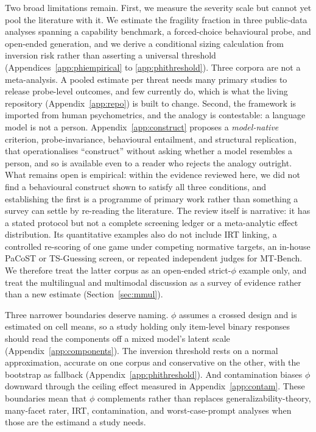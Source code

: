 \documentclass[11pt]{article}
\begin{document}
Two broad limitations remain. First, we
measure the severity scale but cannot yet pool the literature with it. We
estimate the fragility fraction in three public-data analyses spanning a
capability benchmark, a forced-choice behavioural probe, and open-ended
generation, and we derive a conditional sizing calculation from inversion risk
rather than asserting a universal threshold
(Appendices~\ref{app:phiempirical} to \ref{app:phithreshold}). Three corpora
are not a meta-analysis. A pooled estimate per threat needs many primary studies
to release probe-level outcomes, and few currently do, which is what the
living repository (Appendix~\ref{app:repo}) is built to change. Second,
the framework is imported from human psychometrics, and the
analogy is contestable: a language model is not a person.
Appendix~\ref{app:construct} proposes a \emph{model-native}
criterion, probe-invariance, behavioural entailment, and structural replication,
that operationalises ``construct'' without asking whether a model resembles a
person, and so is available even to a reader who rejects the analogy outright.
What remains open is empirical: within the evidence reviewed here, we did not
find a behavioural construct shown to satisfy all three conditions, and
establishing the first is a programme of primary work rather than something a
survey can settle by re-reading the literature. The review itself is narrative:
it has a stated protocol but not a complete screening ledger or a meta-analytic
effect distribution. Its quantitative examples also do not include IRT linking,
a controlled re-scoring of one game under competing normative targets, an
in-house PaCoST or TS-Guessing screen, or repeated independent judges for
MT-Bench. We therefore treat the latter corpus as an open-ended strict-$\phi$
example only, and treat the multilingual and multimodal discussion as a survey
of evidence rather than a new estimate (Section~\ref{sec:mmul}).

Three narrower boundaries deserve naming. $\phi$ assumes a crossed design and is
estimated on cell means, so a study holding only item-level binary responses
should read the components off a mixed model's latent scale
(Appendix~\ref{app:components}). The inversion threshold rests on a normal
approximation, accurate on one corpus and conservative on the other, with the
bootstrap as fallback (Appendix~\ref{app:phithreshold}). And contamination biases
$\phi$ downward through the ceiling effect measured in
Appendix~\ref{app:contam}. These boundaries mean that $\phi$ complements rather
than replaces generalizability-theory, many-facet rater, IRT, contamination, and
worst-case-prompt analyses when those are the estimand a study needs.
\end{document}
